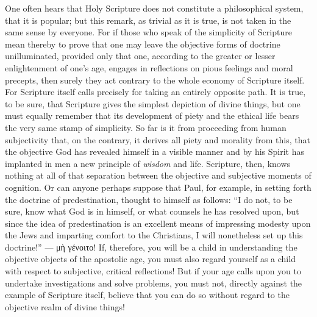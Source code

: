 \documentclass[12pt]{book}
\newcommand{\opage}[1]{\marginnote{\footnotesize\textit{[#1]}}}
\begin{document}
\opage{115} One often hears that Holy Scripture does not constitute a philosophical
system, that it is popular; but this remark, as trivial as it is true, is not
taken in the same sense by everyone. For if those who speak of the simplicity
of Scripture mean thereby to prove that one may leave the objective forms of
doctrine unilluminated, provided only that one, according to the greater or
lesser enlightenment of one's age, engages in reflections on pious feelings
and moral precepts, then surely they act contrary to the whole economy of
Scripture itself. For Scripture itself calls precisely for taking an entirely
opposite path. It is true, to be sure, that Scripture gives the simplest
depiction of divine things, but one must equally remember that its development
of piety and the ethical life bears the very same stamp of simplicity. So far
is it from
\opage{116} proceeding from human subjectivity that, on the contrary, it derives all piety
and morality from this, that the objective God has revealed himself in a
visible manner and by his Spirit has implanted in men a new principle of
\emph{wisdom} and life. Scripture, then, knows nothing at all of that
separation between the objective and subjective moments of cognition. Or can
anyone perhaps suppose that Paul, for example, in setting forth the doctrine
of predestination, thought to himself as follows: ``I do not, to be sure, know
what God is in himself, or what counsels he has resolved upon, but since the
idea of predestination is an excellent means of impressing modesty upon the
Jews and imparting comfort to the Christians, I will nonetheless set up this
doctrine!'' --- μὴ γένοιτο! If, therefore, you will be a child in
understanding the objective objects of the apostolic age, you must also
regard yourself as a child with respect to subjective, critical reflections!
But if your age calls upon you to undertake investigations and solve
problems, you must not, directly against the example of Scripture itself,
believe that you can do so without regard to the objective realm of divine
things!
\end{document}
